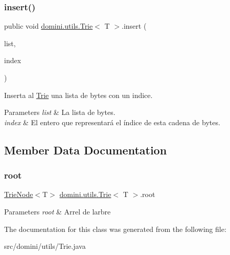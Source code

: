 \subsubsection{\texorpdfstring{insert()}{insert()}}
{\footnotesize\ttfamily public void \hyperlink{classdomini_1_1utils_1_1Trie}{domini.\+utils.\+Trie}$<$ T $>$.insert (\begin{DoxyParamCaption}\item[{Array\+List$<$ T $>$}]{list,  }\item[{Integer}]{index }\end{DoxyParamCaption})\hspace{0.3cm}{\ttfamily [inline]}}



Inserta al \hyperlink{classdomini_1_1utils_1_1Trie}{Trie} una lista de bytes con un indice. 


\begin{DoxyParams}{Parameters}
{\em list} & La lista de bytes. \\
\hline
{\em index} & El entero que representará el índice de esta cadena de bytes. \\
\hline
\end{DoxyParams}


\subsection{Member Data Documentation}
\mbox{\label{classdomini_1_1utils_1_1Trie_a60ef63a6c55d07710d33892ccc899bce}} 
\subsubsection{\texorpdfstring{root}{root}}
{\footnotesize\ttfamily \hyperlink{classdomini_1_1utils_1_1TrieNode}{Trie\+Node}$<$T$>$ \hyperlink{classdomini_1_1utils_1_1Trie}{domini.\+utils.\+Trie}$<$ T $>$.root\hspace{0.3cm}{\ttfamily [private]}}


\begin{DoxyParams}{Parameters}
{\em root} & Arrel de l\textquotesingle{}arbre \\
\hline
\end{DoxyParams}


The documentation for this class was generated from the following file\+:\begin{DoxyCompactItemize}
\item 
src/domini/utils/Trie.\+java\end{DoxyCompactItemize}
